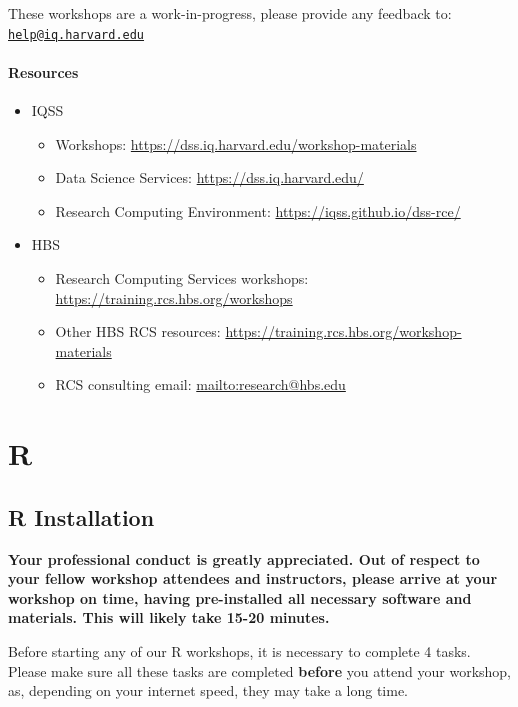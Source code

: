\documentclass[
]{book}
\providecommand{\tightlist}{%
  \setlength{\itemsep}{0pt}\setlength{\parskip}{0pt}}
\begin{document}
These workshops are a work-in-progress, please provide any feedback to: \href{mailto:help@iq.harvard.edu}{\nolinkurl{help@iq.harvard.edu}}

\hypertarget{resources}{%
\subsection{Resources}\label{resources}}

\begin{itemize}
\tightlist
\item
  IQSS

  \begin{itemize}
  \tightlist
  \item
    Workshops: \url{https://dss.iq.harvard.edu/workshop-materials}
  \item
    Data Science Services: \url{https://dss.iq.harvard.edu/}
  \item
    Research Computing Environment: \url{https://iqss.github.io/dss-rce/}
  \end{itemize}
\item
  HBS

  \begin{itemize}
  \tightlist
  \item
    Research Computing Services workshops: \url{https://training.rcs.hbs.org/workshops}
  \item
    Other HBS RCS resources: \url{https://training.rcs.hbs.org/workshop-materials}
  \item
    RCS consulting email: \url{mailto:research@hbs.edu}
  \end{itemize}
\end{itemize}

\hypertarget{part-r}{%
\part{R}\label{part-r}}

\hypertarget{r-installation}{%
\chapter{R Installation}\label{r-installation}}

\textbf{Your professional conduct is greatly appreciated. Out of respect to your fellow workshop attendees and instructors, please arrive at your workshop on time, having pre-installed all necessary software and materials. This will likely take 15-20 minutes.}

Before starting any of our R workshops, it is necessary to complete 4 tasks. Please make sure all these tasks are completed \textbf{before} you attend your workshop, as, depending on your internet speed, they may take a long time.
\end{document}

